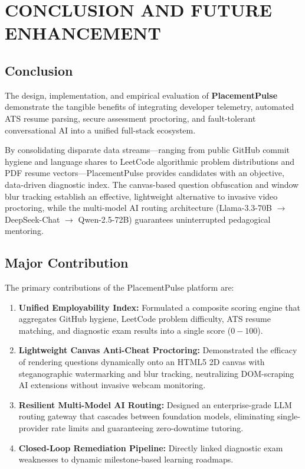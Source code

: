 \chapter{CONCLUSION AND FUTURE ENHANCEMENT}

\section{Conclusion}
The design, implementation, and empirical evaluation of \textbf{PlacementPulse} demonstrate the tangible benefits of integrating developer telemetry, automated ATS resume parsing, secure assessment proctoring, and fault-tolerant conversational AI into a unified full-stack ecosystem.

By consolidating disparate data streams—ranging from public GitHub commit hygiene and language shares to LeetCode algorithmic problem distributions and PDF resume vectors—PlacementPulse provides candidates with an objective, data-driven diagnostic index. The canvas-based question obfuscation and window blur tracking establish an effective, lightweight alternative to invasive video proctoring, while the multi-model AI routing architecture (Llama-3.3-70B $\rightarrow$ DeepSeek-Chat $\rightarrow$ Qwen-2.5-72B) guarantees uninterrupted pedagogical mentoring.

\section{Major Contribution}
The primary contributions of the PlacementPulse platform are:
\begin{enumerate}
    \item \textbf{Unified Employability Index:} Formulated a composite scoring engine that aggregates GitHub hygiene, LeetCode problem difficulty, ATS resume matching, and diagnostic exam results into a single score ($0-100$).
    \item \textbf{Lightweight Canvas Anti-Cheat Proctoring:} Demonstrated the efficacy of rendering questions dynamically onto an HTML5 2D canvas with steganographic watermarking and blur tracking, neutralizing DOM-scraping AI extensions without invasive webcam monitoring.
    \item \textbf{Resilient Multi-Model AI Routing:} Designed an enterprise-grade LLM routing gateway that cascades between foundation models, eliminating single-provider rate limits and guaranteeing zero-downtime tutoring.
    \item \textbf{Closed-Loop Remediation Pipeline:} Directly linked diagnostic exam weaknesses to dynamic milestone-based learning roadmaps.
\end{enumerate}

